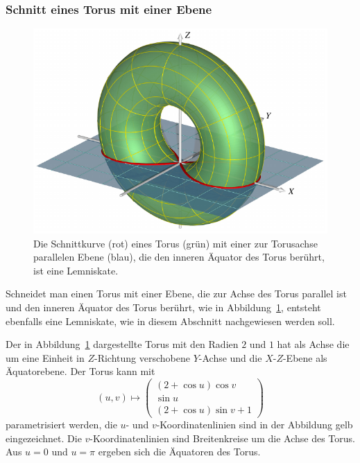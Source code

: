 \subsubsection{Schnitt eines Torus mit einer Ebene}
\begin{figure}
\centering
\includegraphics{chapters/110-elliptisch/images/torusschnitt.pdf}
\caption{Die Schnittkurve (rot) eines Torus (grün)
mit einer zur Torusachse parallelen Ebene (blau),
die den inneren Äquator des Torus berührt, ist eine Lemniskate.
\label{buch:elliptisch:lemniskate:torusschnitt}}
\end{figure}
%
Schneidet man einen Torus mit einer Ebene, die zur Achse des Torus
parallel ist und den inneren Äquator des Torus berührt, wie in
Abbildung~\ref{buch:elliptisch:lemniskate:torusschnitt},
entsteht ebenfalls eine Lemniskate, wie in diesem Abschnitt nachgewiesen
werden soll.

Der in Abbildung~\ref{buch:elliptisch:lemniskate:torusschnitt}
dargestellte Torus mit den Radien $2$ und $1$ hat als Achse die
um eine Einheit in $Z$-Richtung verschobene $Y$-Achse und die
$X$-$Z$-Ebene als Äquatorebene.
Der Torus kann mit
\[
(u,v)
\mapsto
\begin{pmatrix}
(2+\cos u) \cos v    \\
   \sin u            \\
(2+\cos u) \sin v + 1
\end{pmatrix}
\]
parametrisiert werden, die $u$- und $v$-Koordinatenlinien sind 
in der Abbildung gelb eingezeichnet.
Die $v$-Koordinatenlinien sind Breitenkreise um die Achse des Torus.
Aus $u=0$ und $u=\pi$ ergeben sich die Äquatoren des Torus.

